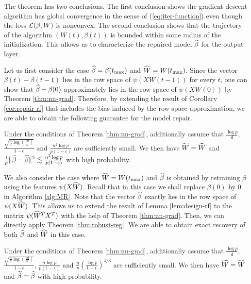 The theorem has two conclusions. The first conclusion shows the gradient descent algorithm has global convergence in the sense of (\ref{eq:iter-function}) even though the loss ${\mathcal L}(\beta,W)$ is nonconvex. The second conclusion shows that the trajectory of the algorithm $(W(t),\beta(t))$ is bounded within some radius of the initialization. This allows us to characterize the repaired model $\widetilde{\beta}$ for the output layer.

Let us first consider the case $\widehat{\beta}=\beta(t_{\max})$ and $\widehat{W}=W(t_{\max})$. Since the vector $\beta(t)-\beta(t-1)$ lies in the row space of $\psi(XW(t-1))$ for every $t$, one can show that $\widehat{\beta}-\beta(0)$ approximately lies in the row space of $\psi(XW(0))$ by Theorem \ref{thm:nn-grad}. Therefore, by extending the result of Corollary \ref{cor:repair-rf} that includes the bias induced by the row space approximation, we are able to obtain the following guarantee for the model repair.





\vskip10pt
\begin{thm}\label{thm:repair-nn-1}
Under the conditions of Theorem \ref{thm:nn-grad}, additionally assume that $\frac{\log p}{d}$, $\frac{\sqrt{\frac{n}{d}\log\left(\frac{ed}{n}\right)}}{1-\epsilon}$ and $\frac{n^2\log p}{p(1-\epsilon)}$ are sufficiently small. We then have $\widetilde{W}=\widehat{W}$ and $\frac{1}{p}\|\widetilde{\beta}-\widehat{\beta}\|^2 \lesssim \frac{n^2\log p}{p(1-\varepsilon)}$ with high probability.
\end{thm}


We also consider the case where $\widehat{W}=W(t_{\max})$ and $\widehat{\beta}$ is obtained by retraining $\beta$ using the features $\psi(X\widehat{W})$. Recall that in this case we shall replace $\beta(0)$ by $0$ in Algorithm \ref{alg:MR}. Note that the vector $\widehat{\beta}$ exactly lies in the row space of $\psi(X\widehat{W})$. This allows us to extend the result of Lemma \ref{lem:design-rf} to the matrix $\psi(\widehat{W}^TX^T)$ with the help of Theorem \ref{thm:nn-grad}. Then, we can directly apply Theorem \ref{thm:robust-reg}. We are able to obtain exact recovery of both $\widehat{\beta}$ and $\widehat{W}$ in this case.

\vskip10pt
\begin{thm}\label{thm:repair-nn-2}
Under the conditions of Theorem \ref{thm:nn-grad}, additionally assume that $\frac{\log p}{d}$, $\frac{\sqrt{\frac{n}{d}\log\left(\frac{ed}{n}\right)}}{1-\epsilon}$, $\frac{n\log p}{p(1-\epsilon)}$ and $\frac{n}{p}\left(\frac{\log p}{1-\epsilon}\right)^{4/3}$ are sufficiently small. We then have $\widetilde{W}=\widehat{W}$ and $\widetilde{\beta}=\widehat{\beta}$ with high probability.
\end{thm}
\vskip10pt

